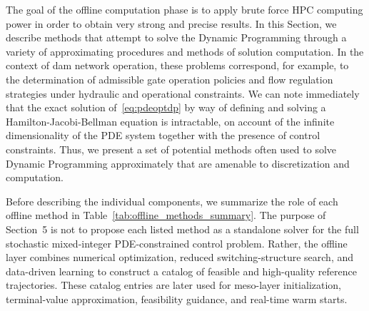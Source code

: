 \documentclass{article}
\newcommand{\1}{\mathds{1}}          %
\theoremstyle{definition}
\begin{document}
\begin{sloppypar}
The goal of the offline computation phase is to apply brute force HPC computing power in order to obtain very strong and precise results. In this Section, we describe methods that attempt to solve the Dynamic Programming through a variety of approximating procedures and methods of solution computation. In the context of dam network operation, these problems correspond, for example, to the determination of admissible gate operation policies and flow regulation strategies under hydraulic and operational constraints. We can note immediately that the exact solution of~\eqref{eq:pdeoptdp} by way of defining and solving a Hamilton-Jacobi-Bellman equation is intractable, on account of the infinite dimensionality of the PDE system together with the presence of control constraints. Thus, we present a set of potential methods often used to solve Dynamic Programming approximately that are amenable to discretization and computation.

Before describing the individual components, we summarize the role of each offline method in Table~\ref{tab:offline_methods_summary}. The purpose of Section~5 is not to propose each listed method as a standalone solver for the full stochastic mixed-integer PDE-constrained control problem. Rather, the offline layer combines numerical optimization, reduced switching-structure search, and data-driven learning to construct a catalog of feasible and high-quality reference trajectories. These catalog entries are later used for meso-layer initialization, terminal-value approximation, feasibility guidance, and real-time warm starts.


\end{sloppypar}
\end{document}
